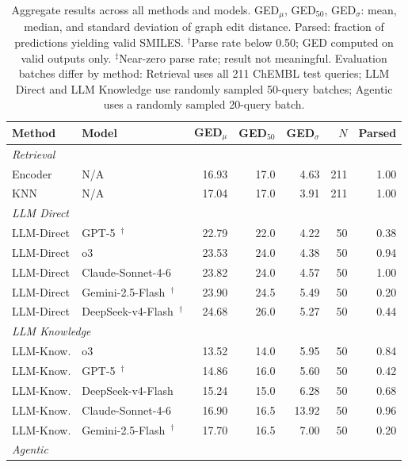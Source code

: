 \documentclass[conference]{IEEEtran}
\begin{document}
\begin{table}[t]
\centering
\scriptsize
\setlength{\tabcolsep}{3.4pt}
\caption{Aggregate results across all methods and models. GED$_\mu$, GED$_{50}$, GED$_\sigma$: mean, median, and standard deviation of graph edit distance. Parsed: fraction of predictions yielding valid SMILES. $^\dagger$Parse rate below 0.50; GED computed on valid outputs only. $^\ddagger$Near-zero parse rate; result not meaningful. Evaluation batches differ by method: Retrieval uses all 211 ChEMBL test queries; LLM Direct and LLM Knowledge use randomly sampled 50-query batches; Agentic uses a randomly sampled 20-query batch.}
\label{tab:main_results}
\begin{tabular}{llrrrrr}
\toprule
Method & Model & GED$_\mu$ & GED$_{50}$ & GED$_\sigma$ & $N$ & Parsed\\
\midrule
\multicolumn{7}{l}{\emph{Retrieval}}\\
Encoder & N/A & 16.93 & 17.0 & 4.63 & 211 & 1.00\\
KNN & N/A & 17.04 & 17.0 & 3.91 & 211 & 1.00\\
\midrule
\multicolumn{7}{l}{\emph{LLM Direct}}\\
LLM-Direct & GPT-5~\cite{gpt-5}$^\dagger$ & 22.79 & 22.0 & 4.22 & 50 & 0.38\\
LLM-Direct & o3~\cite{o3_and_o4-mini} & 23.53 & 24.0 & 4.38 & 50 & 0.94\\
LLM-Direct & Claude-Sonnet-4-6~\cite{claude-sonnet-4-6} & 23.82 & 24.0 & 4.57 & 50 & 1.00\\
LLM-Direct & Gemini-2.5-Flash~\cite{gemini2-5}$^\dagger$ & 23.90 & 24.5 & 5.49 & 50 & 0.20\\
LLM-Direct & DeepSeek-v4-Flash~\cite{deepseek2026deepseek}$^\dagger$ & 24.68 & 26.0 & 5.27 & 50 & 0.44\\
\midrule
\multicolumn{7}{l}{\emph{LLM Knowledge}}\\
LLM-Know. & o3~\cite{o3_and_o4-mini} & 13.52 & 14.0 & 5.95 & 50 & 0.84\\
LLM-Know. & GPT-5~\cite{gpt-5}$^\dagger$ & 14.86 & 16.0 & 5.60 & 50 & 0.42\\
LLM-Know. & DeepSeek-v4-Flash~\cite{deepseek2026deepseek} & 15.24 & 15.0 & 6.28 & 50 & 0.68\\
LLM-Know. & Claude-Sonnet-4-6~\cite{claude-sonnet-4-6} & 16.90 & 16.5 & 13.92 & 50 & 0.96\\
LLM-Know. & Gemini-2.5-Flash~\cite{gemini2-5}$^\dagger$ & 17.70 & 16.5 & 7.00 & 50 & 0.20\\
\midrule
\multicolumn{7}{l}{\emph{Agentic}}\\

\end{tabular}
\end{table}
\end{document}
